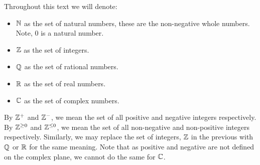 \guard

Throughout this text we will denote:
\begin{itemize}
  \item $\mathbb{N}$ as the set of natural numbers, these are the non-negative whole numbers.
    Note, $0$ is a natural number.
  \item $\mathbb{Z}$ as the set of integers.
  \item $\mathbb{Q}$ as the set of rational numbers.
  \item $\mathbb{R}$ as the set of real numbers.
  \item $\mathbb{C}$ as the set of complex numbers.
\end{itemize}

By $\mathbb{Z}^+$ and $\mathbb{Z}^-$, we mean the set of all positive and negative integers respectively.
By $\mathbb{Z}^{\geq 0}$ and $\mathbb{Z}^{\leq 0}$, we mean the set of all non-negative and non-positive integers respectively.
Similarly, we may replace the set of integers, $\mathbb{Z}$ in the previous with $\mathbb{Q}$ or $\mathbb{R}$ for the same meaning.
Note that as positive and negative are not defined on the complex plane, we cannot do the same for $\mathbb{C}$.

